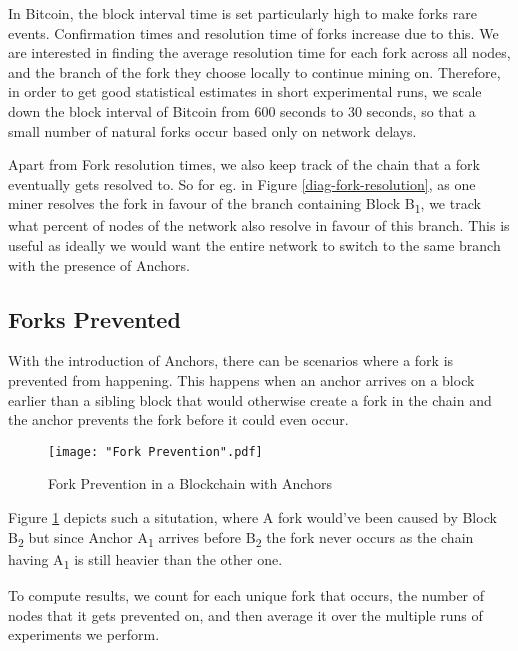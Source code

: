 In Bitcoin, the block interval time is set particularly high to make forks rare events. Confirmation times and resolution time of forks increase due to this. 
We are interested in finding the average resolution time for each fork across all nodes, and the branch of the fork they choose locally to continue mining on. 
Therefore, in order to get good statistical estimates in short experimental runs, we scale down the block interval of Bitcoin from 600 seconds to 30 seconds, so that a small number of natural forks occur based only on network delays.

Apart from Fork resolution times, we also keep track of the chain that a fork eventually gets resolved to. 
So for eg. in Figure \ref{diag-fork-resolution}, as one miner resolves the fork in favour of the branch containing Block B\textsubscript{1}, we track what percent of nodes of the network also resolve in favour of this branch.
This is useful as ideally we would want the entire network to switch to the same branch with the presence of Anchors.


\newpage
\subsection{Forks Prevented} \label{exp-forks-prevented}

With the introduction of Anchors, there can be scenarios where a fork is prevented from happening. This happens when an anchor arrives on a block earlier than a sibling block that would otherwise create a fork in the chain and the anchor prevents the fork before it could even occur.

\begin{figure}[!htb]
    \centering
    \texttt{[image: "Fork Prevention".pdf]}
    \caption{Fork Prevention in a Blockchain with Anchors}
        
    \label{diag-fork-prevention}
\end{figure}


Figure \ref{diag-fork-prevention} depicts such a situtation, where A fork would've been caused by Block B\textsubscript{2} but since Anchor A\textsubscript{1} arrives before B\textsubscript{2} the fork never occurs as the chain having A\textsubscript{1} is still heavier than the other one.

To compute results, we count for each unique fork that occurs, the number of nodes that it gets prevented on, and then average it over the multiple runs of experiments we perform.

